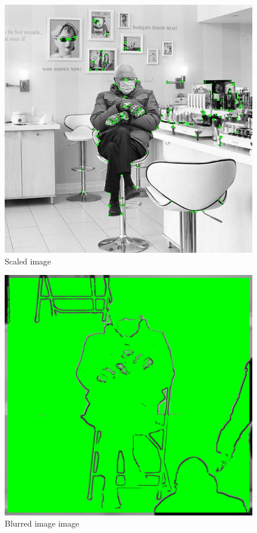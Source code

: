 \documentclass[12pt,a4paper]{report}
\begin{document}
\begin{figure}[hb]
	\centering
	\includegraphics[width=\textwidth]{bernieBenefitBeautySalon.jpeg_keypoints}
	\caption{Scaled image}
\end{figure}
\begin{figure}[hb]
	\centering
	\includegraphics[width=\textwidth]{bernieMoreblurred.jpg_keypoints}
	\caption{Blurred image image}
\end{figure}
\end{document}
